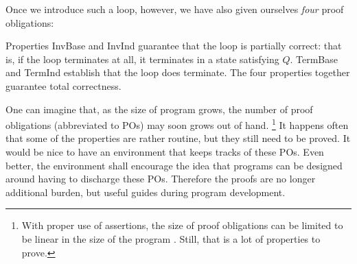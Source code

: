 \documentclass[runningheads]{llncs}
\newcommand{\Conid}[1]{\mathit{#1}}
\newcommand{\Varid}[1]{\mathit{#1}}
\renewcommand{\geq}{\geqslant}
\def\resethooks{%
  \global\let\SaveRestoreHook\empty
  \global\let\ColumnHook\empty}
\let\hspre\empty
\let\hspost\empty
\let\Varid\mathit
\let\Conid\mathit
\newcounter{linenum}
\begin{document}
Once we introduce such a loop, however, we have also given ourselves \emph{four} proof obligations:
\resethooks
Properties {\sf InvBase} and {\sf InvInd} guarantee that the loop is partially correct: that is, if the loop terminates at all, it terminates in a state satisfying \ensuremath{\Conid{Q}}.
{\sf TermBase} and {\sf TermInd} establish that the loop does terminate.
The four properties together guarantee total correctness.

One can imagine that, as the size of program grows, the number of proof obligations (abbreviated to POs) may soon grows out of hand.
\footnote{With proper use of assertions, the size of proof obligations can be limited to be linear in the size of the program \cite{Dijkstra:69:Understanding}. Still, that is a lot of properties to prove.}
It happens often that some of the properties are rather routine, but they still need to be proved.
It would be nice to have an environment that keeps tracks of these POs.
Even better, the environment shall encourage the idea that programs can be designed around having to discharge these POs.
Therefore the proofs are no longer additional burden, but useful guides during program development.
\end{document}
